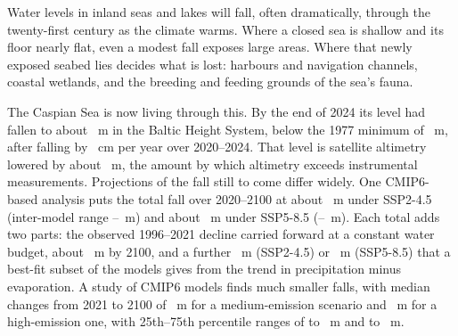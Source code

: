 
Water levels in inland seas and lakes will fall, often dramatically, through the twenty-first century as the climate warms\citep{prange2020}. Where a closed sea is shallow and its floor nearly flat, even a modest fall exposes large areas. Where that newly exposed seabed lies decides what is lost: harbours and navigation channels, coastal wetlands, and the breeding and feeding grounds of the sea's fauna.

The Caspian Sea is now living through this. By the end of 2024 its level had fallen to about ~m in the Baltic Height System, below the 1977 minimum of ~m, after falling by ~cm per year over 2020--2024. That level is satellite altimetry lowered by about ~m, the amount by which altimetry exceeds instrumental measurements\citep{ginzburg2025}. Projections of the fall still to come differ widely. One CMIP6-based analysis puts the total fall over 2020--2100 at about ~m under SSP2-4.5 (inter-model range --~m) and about ~m under SSP5-8.5 (--~m). Each total adds two parts: the observed 1996--2021 decline carried forward at a constant water budget, about ~m by 2100, and a further ~m (SSP2-4.5) or ~m (SSP5-8.5) that a best-fit subset of the models gives from the trend in precipitation minus evaporation\citep{samant2023}. A study of  CMIP6 models finds much smaller falls, with median changes from 2021 to 2100 of ~m for a medium-emission scenario and ~m for a high-emission one, with 25th--75th percentile ranges of  to ~m and  to ~m\citep{hoseini2025}.

